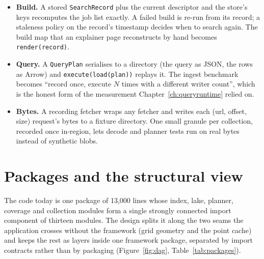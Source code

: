 \documentclass[10pt,a4paper]{article}
\newcommand{\code}[1]{\texttt{#1}}
\begin{document}
\begin{itemize}
\item \textbf{Build.} A stored \code{SearchRecord} plus the current descriptor and the store's keys recomputes the
  job list exactly. A failed build is re-run from its record; a staleness policy on the record's timestamp decides
  when to search again. The build map that an explainer page reconstructs by hand becomes \code{render(record)}.
\item \textbf{Query.} A \code{QueryPlan} serialises to a directory (the query as JSON, the rows as Arrow) and
  \code{execute(load(plan))} replays it. The ingest benchmark becomes ``record once, execute $N$ times with a
  different writer count'', which is the honest form of the measurement Chapter~\ref{ch:queryruntime} relied on.
\item \textbf{Bytes.} A recording fetcher wraps any fetcher and writes each (url, offset, size) request's bytes to
  a fixture directory. One small granule per collection, recorded once in-region, lets decode and planner tests run
  on real bytes instead of synthetic blobs.
\end{itemize}

\section{Packages and the structural view}
\label{ch:packages}

The code today is one package of 13{,}000 lines whose index, lake, planner, coverage and collection modules form a
single strongly connected import component of thirteen modules. The design splits it along the two seams the
application crosses without the framework (grid geometry and the point cache) and keeps the rest as layers inside
one framework package, separated by import contracts rather than by packaging (Figure~\ref{fig:dag}, Table~\ref{tab:packages}).
\end{document}
